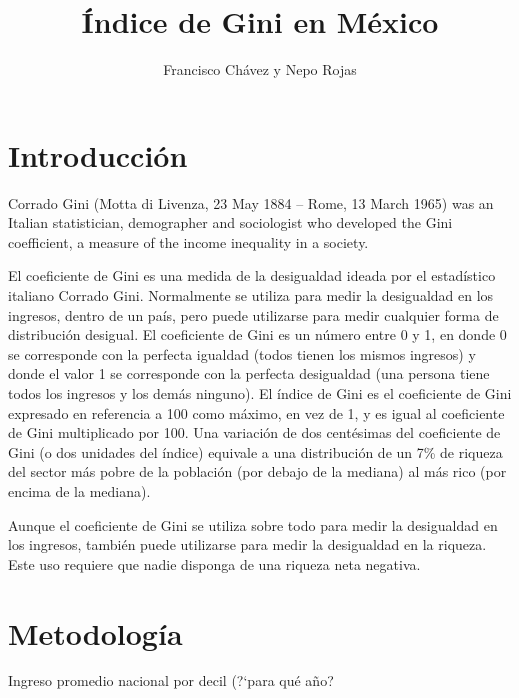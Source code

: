 \documentclass{article}
\author{Francisco Chávez y Nepo Rojas}
\title{Índice de Gini en México}
\begin{document}
\begin{pycode}
\end{pycode}

\maketitle
\begin{abstract}
\end{abstract}

\section*{Introducción}
Corrado Gini (Motta di Livenza, 23 May 1884 – Rome, 13 March 1965) was an Italian statistician,
demographer and sociologist who developed the Gini coefficient, a measure of the income inequality
in a society.

El coeficiente de Gini es una medida de la desigualdad ideada por el estadístico italiano Corrado
Gini. Normalmente se utiliza para medir la desigualdad en los ingresos, dentro de un país, pero
puede utilizarse para medir cualquier forma de distribución desigual. El coeficiente de Gini es un
número entre 0 y 1, en donde 0 se corresponde con la perfecta igualdad (todos tienen los mismos
ingresos) y donde el valor 1 se corresponde con la perfecta desigualdad (una persona tiene todos los
ingresos y los demás ninguno). El índice de Gini es el coeficiente de Gini expresado en referencia a
100 como máximo, en vez de 1, y es igual al coeficiente de Gini multiplicado por 100. Una variación
de dos centésimas del coeficiente de Gini (o dos unidades del índice) equivale a una distribución de
un 7\% de riqueza del sector más pobre de la población (por debajo de la mediana) al más rico (por
encima de la mediana).

Aunque el coeficiente de Gini se utiliza sobre todo para medir la desigualdad en los ingresos,
también puede utilizarse para medir la desigualdad en la riqueza. Este uso requiere que nadie
disponga de una riqueza neta negativa.\cite{carpenter2000}

\section*{Metodología}
\begin{table}[H]
\centering
\caption{Ingreso promedio nacional por decil (?`para qué año?}
\label{table:diferenciasTasas}
\end{table}
\end{document}
